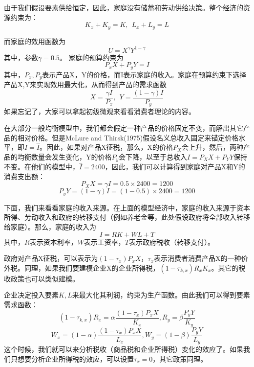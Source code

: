 \documentclass[cn,12pt,math=newtx,citestyle=gb7714-2015,bibstyle=gb7714-2015]{elegantbook}
\begin{document}
	由于我们假设要素供给恒定，因此，家庭没有储蓄和劳动供给决策。整个经济的资源约束为：
	\begin{equation}
		K_x+K_y=K,~~L_x+L_y=L
	\end{equation}
	
	而家庭的效用函数为
	\begin{equation}
		U=X^\gamma Y^{1-\gamma}
	\end{equation}
	其中，参数$\gamma=0.5$。
	家庭的预算约束为
	\begin{equation}
		P_xX+P_yY=I
	\end{equation}
	其中，$P_x,P_y$表示产品X，Y的价格，而I表示家庭的收入。家庭在预算约束下选择产品X,Y来实现效用最大化，从而得到产品的需求函数
	\begin{equation}
		X=\frac{\gamma I}{P_x},~~Y=\frac{(1-\gamma) I}{P_y}
	\end{equation}
	如果忘记了，大家可以拿起初级微观来看看消费者理论的内容。
	
	在大部分一般均衡模型中，我们都会假定一种产品的价格固定不变，而解出其它产品的相对价格。但是McLure and Thirsk(1975)假设名义总收入固定来锚定价格水平，即$I=\hat{I}$。因此，如果对产品X征税，那么，X的价格$P_X$会上升，然后，两种产品的均衡数量会发生变化，Y的价格$P_y$会下降，以至于总收入$I=P_XX+P_YY$保持不变。在他们的模型中，$\hat{I}=2400$，因此，我们可以计算得到家庭对产品X和Y的消费支出额：
	\begin{equation}
		P_XX=\gamma I=0.5 \times 2400=1200
	\end{equation}
	\begin{equation}
		P_yY=(1-\gamma) I=(1-0.5) \times 2400=1200
	\end{equation}
	
	下面，我们来看看家庭的收入来源。在上面的模型经济中，家庭的收入来源于资本所得、劳动收入和政府的转移支付（例如养老金等，此处假设政府将全部收入转移给家庭）。那么，家庭的收入为
	\begin{equation}
		I=RK+WL+T
	\end{equation}
	其中，$R$表示资本利率，$W$表示工资率，$T$表示政府税收（转移支付）。
	
	政府对产品X征税，可以表示为$(1-\tau_x)P_xX$，$\tau_x$表示消费者消费产品X的一种价外税。同理，如果我们要建模企业X的企业所得税，$(1-\tau_{k,x})R_xK_x$。其它的税收政策也可以类似建模。
	
	企业决定投入要素$K,L$来最大化其利润，约束为生产函数。由此我们可以得到要素需求函数：
	\begin{equation}
		(1-\tau_{k,x})R_x=\alpha \frac{(1-\tau_x)P_xX}{K_x},R_y=\beta \frac{P_yY}{K_y}
	\end{equation}
	\begin{equation}
		W_x=(1-\alpha) \frac{(1-\tau_x)P_xX}{L_x},W_y=(1-\beta) \frac{P_yY}{L_y}
	\end{equation}
	这个时候，我们就可以来分析税收（商品税和企业所得税）变化的效应了。如果我们只想要分析企业所得税的效应，可以设置$\tau_x=0$，其它政策同理。
	
\end{document}
